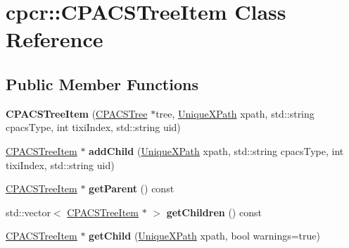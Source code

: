 \hypertarget{classcpcr_1_1CPACSTreeItem}{\section{cpcr\-:\-:C\-P\-A\-C\-S\-Tree\-Item Class Reference}
\label{classcpcr_1_1CPACSTreeItem}
}
\subsection*{Public Member Functions}
\begin{DoxyCompactItemize}
\item 
\hypertarget{classcpcr_1_1CPACSTreeItem_ac429cedfecfbcf4ffe8545699545be53}{{\bfseries C\-P\-A\-C\-S\-Tree\-Item} (\hyperlink{classcpcr_1_1CPACSTree}{C\-P\-A\-C\-S\-Tree} $\ast$tree, \hyperlink{classcpcr_1_1UniqueXPath}{Unique\-X\-Path} xpath, std\-::string cpacs\-Type, int tixi\-Index, std\-::string uid)}\label{classcpcr_1_1CPACSTreeItem_ac429cedfecfbcf4ffe8545699545be53}

\item 
\hypertarget{classcpcr_1_1CPACSTreeItem_af65aa4fa5c6f78dd06be05f4548c1611}{\hyperlink{classcpcr_1_1CPACSTreeItem}{C\-P\-A\-C\-S\-Tree\-Item} $\ast$ {\bfseries add\-Child} (\hyperlink{classcpcr_1_1UniqueXPath}{Unique\-X\-Path} xpath, std\-::string cpacs\-Type, int tixi\-Index, std\-::string uid)}\label{classcpcr_1_1CPACSTreeItem_af65aa4fa5c6f78dd06be05f4548c1611}

\item 
\hypertarget{classcpcr_1_1CPACSTreeItem_ac3d9050d4eacb0b3a453c20bea489fae}{\hyperlink{classcpcr_1_1CPACSTreeItem}{C\-P\-A\-C\-S\-Tree\-Item} $\ast$ {\bfseries get\-Parent} () const }\label{classcpcr_1_1CPACSTreeItem_ac3d9050d4eacb0b3a453c20bea489fae}

\item 
\hypertarget{classcpcr_1_1CPACSTreeItem_a4eb43b2e19bc43c0ec1bf217acbbf312}{std\-::vector$<$ \hyperlink{classcpcr_1_1CPACSTreeItem}{C\-P\-A\-C\-S\-Tree\-Item} $\ast$ $>$ {\bfseries get\-Children} () const }\label{classcpcr_1_1CPACSTreeItem_a4eb43b2e19bc43c0ec1bf217acbbf312}

\item 
\hypertarget{classcpcr_1_1CPACSTreeItem_a929e21f11dcfabf24ebbbcf00eefccba}{\hyperlink{classcpcr_1_1CPACSTreeItem}{C\-P\-A\-C\-S\-Tree\-Item} $\ast$ {\bfseries get\-Child} (\hyperlink{classcpcr_1_1UniqueXPath}{Unique\-X\-Path} xpath, bool warnings=true)}\label{classcpcr_1_1CPACSTreeItem_a929e21f11dcfabf24ebbbcf00eefccba}


\end{DoxyCompactItemize}
